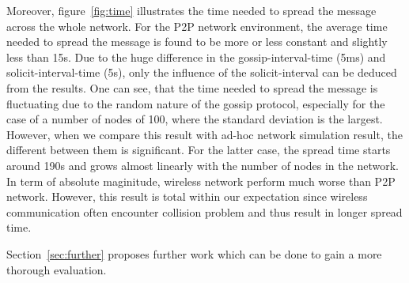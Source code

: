 Moreover, figure~\ref{fig:time} illustrates the time needed to spread the message across the whole network. For the P2P network environment, the average time needed to spread the message is found to be more or less constant and slightly less than 15s. Due to the huge difference in the gossip-interval-time (5ms) and solicit-interval-time (5s), only the influence of the solicit-interval can be deduced from the results. One can see, that the time needed to spread the message is fluctuating due to the random nature of the gossip protocol, especially for the case of a number of nodes of 100, where the standard deviation is the largest. However, when we compare this result with ad-hoc network simulation result, the different between them is significant. For the latter case, the spread time starts around 190s and grows almost linearly with the number of nodes in the network. In term of absolute maginitude, wireless network perform much worse than P2P network. However, this result is total within our expectation since wireless communication often encounter collision problem and thus result in longer spread time.


Section~\ref{sec:further} proposes further work which can be done to gain a more thorough evaluation.




